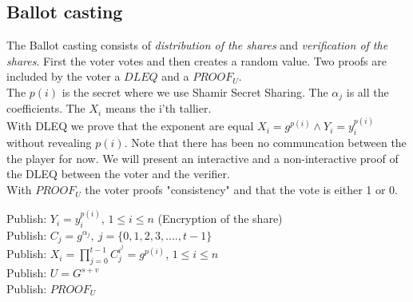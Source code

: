\subsection{Ballot casting}
The  Ballot casting consists of \textit{distribution of the shares} and \textit{verification of the shares}. First the voter votes and then creates a random value. Two proofs are included by the voter a $DLEQ$ and a $PROOF_U$.\\

\noindent
{} The \begin{math}p(i)\end{math} is the secret where we use Shamir Secret Sharing. The \begin{math}\alpha_j\end{math} is all the coefficients. The \begin{math}X_i\end{math} means the i'th tallier. \\

\noindent
{} With DLEQ we prove that the exponent are equal \begin{math}X_i=g^{p(i)}  \land Y_i=y_i^{p(i)} \end{math} without revealing \begin{math}{p(i)} \end{math}. Note that there has been no communcation between the the player for now. We will present an interactive and a non-interactive proof of the DLEQ between the voter and the verifier.\\

\noindent
{} With \begin{math} PROOF_U \end{math} the voter proofs "consistency" and that the vote is either 1 or 0.

\begin{infobox}
Publish: \begin{math}Y_i=y_i^{p(i)} \end{math}, \begin{math}1\leq i\leq n\end{math} (Encryption of the share) \\ 
Publish: \begin{math}C_j=g^{\alpha_j},\ j=\{0,1,2,3,....,t-1 \} \end{math} \\ 
Publish: \begin{math}X_i=\prod\limits_{j=0}^{t-1} C_j^{i^j} =g^{p(i)}\end{math}, \begin{math}1\leq i\leq n\end{math}\\
Publish: \begin{math}U=G^{s+v} \end{math}\\
Publish: \begin{math}PROOF_U \end{math}
\end{infobox}


